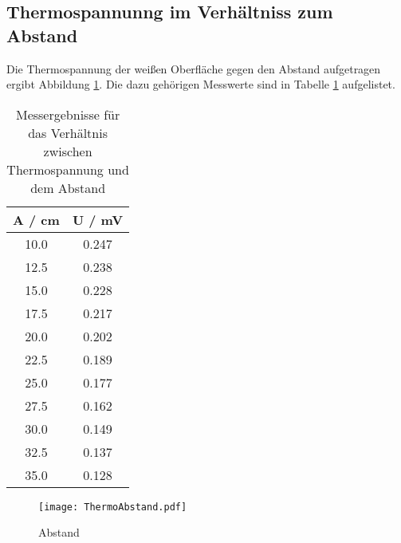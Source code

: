 \newpage
\subsection{Thermospannunng im Verhältniss zum Abstand}
Die Thermospannung der weißen Oberfläche gegen den Abstand aufgetragen ergibt Abbildung \ref{fig:Abstand}. Die dazu gehörigen Messwerte sind in Tabelle \ref{tab:Abstand} aufgelistet.
\begin{table}[H]
  \centering
  \begin{tabular}{c c}
      A / cm & U / mV \\
    \midrule
      10.0  &  0.247 \\
      12.5	&  0.238 \\
      15.0	&  0.228 \\
      17.5	&  0.217 \\
      20.0	&  0.202 \\
      22.5	&  0.189 \\
      25.0	&  0.177 \\
      27.5	&  0.162 \\
      30.0	&  0.149 \\
      32.5	&  0.137 \\
      35.0	&  0.128 \\
  \end{tabular}
  \caption{Messergebnisse für das Verhältnis zwischen Thermospannung und dem Abstand}
  \label{tab:Abstand}
\end{table}

\begin{figure}
  \centering
  \texttt{[image: ThermoAbstand.pdf]}
  \caption{Abstand}
  \label{fig:Abstand}
\end{figure}
\newpage
